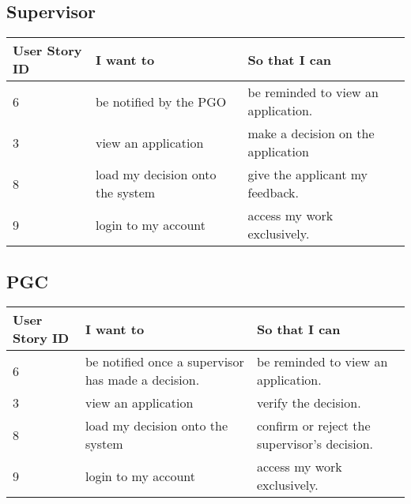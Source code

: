 \documentclass[11pt]{article}
\begin{document}
\subsection{Supervisor}
\begin{table}[H]
	\hskip-4.0cm\begin{tabular}{@{}|l|l|l|@{}}
		
	 \toprule
		\textbf{User Story ID}  & \textbf{I want to}                                & \textbf{So that I can}                                      \\ \midrule
		
	
		6                    & be notified by the PGO                            & be reminded to view an application.                              \\  \midrule
		3                    & view an application                      & make a decision on the application                    \\ \midrule
		8                    & load my decision onto the system                     & give the applicant my feedback.                                  \\ \midrule
		
		9 & login to my account & access my work exclusively. \\ \bottomrule
	\end{tabular}
\end{table}
\subsection{PGC}
\begin{table}[H]
	\hskip-4.0cm\begin{tabular}{@{}|l|l|l|@{}}
	 \toprule
		\textbf{User Story ID}  & \textbf{I want to}                                & \textbf{So that I can}                                      \\ \midrule

		6                    & be notified once a supervisor has made a decision.                            & be reminded to view an application.                            \\ \midrule
		3                    & view an application                     & verify the decision.                   \\ \midrule
		8                    & load my decision onto the system                     & confirm or reject the supervisor's decision.                                         \\ \midrule
		9 & login to my account & access my work exclusively. \\ \bottomrule
	\end{tabular}
\end{table}
\end{document}

